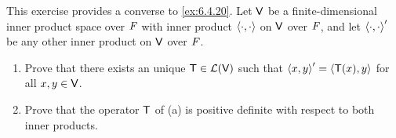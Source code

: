 \begin{ex}\label{ex:6.4.22}
  This exercise provides a converse to \cref{ex:6.4.20}.
  Let \(\mathsf{V}\) be a finite-dimensional inner product space over \(\mathit{F}\) with inner product \(\left\langle\cdot, \cdot\right\rangle\) on \(\mathsf{V}\) over \(\mathit{F}\), and let \(\left\langle\cdot, \cdot\right\rangle'\) be any other inner product on \(\mathsf{V}\) over \(\mathit{F}\).
  \begin{enumerate}
    \item Prove that there exists an unique \(\mathsf{T} \in \mathcal{L}(\mathsf{V})\) such that \(\left\langle x, y\right\rangle' = \left\langle\mathsf{T}(x), y\right\rangle\) for all \(x, y \in \mathsf{V}\).
    \item Prove that the operator \(\mathsf{T}\) of (a) is positive definite with respect to both inner products.
  \end{enumerate}
\end{ex}

